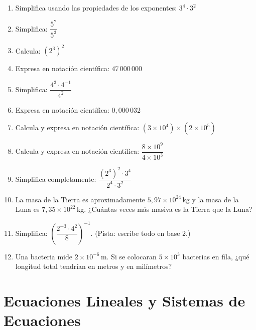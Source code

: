 \documentclass[12pt, a4paper]{article}
\begin{document}
\begin{enumerate}[leftmargin=*, resume]
  \item \facil{} Simplifica usando las propiedades de los exponentes: $3^4 \cdot 3^2$

  \item \facil{} Simplifica: $\dfrac{5^7}{5^3}$

  \item \facil{} Calcula: $(2^3)^2$

  \item \facil{} Expresa en notación científica: $47\,000\,000$

  \item \medio{} Simplifica: $\dfrac{4^3 \cdot 4^{-1}}{4^2}$

  \item \medio{} Expresa en notación científica: $0{,}000\,032$

  \item \medio{} Calcula y expresa en notación científica: $(3 \times 10^4) \times (2 \times 10^5)$

  \item \medio{} Calcula y expresa en notación científica: $\dfrac{8 \times 10^9}{4 \times 10^3}$

  \item \medio{} Simplifica completamente: $\dfrac{(2^3)^2 \cdot 3^4}{2^4 \cdot 3^2}$

  \item \dificil{} La masa de la Tierra es aproximadamente $5{,}97 \times 10^{24}$\,kg y la masa de la Luna es $7{,}35 \times 10^{22}$\,kg. ¿Cuántas veces más masiva es la Tierra que la Luna?

  \item \dificil{} Simplifica: $\left(\dfrac{2^{-3} \cdot 4^2}{8}\right)^{-1}$. (Pista: escribe todo en base 2.)

  \item \dificil{} Una bacteria mide $2 \times 10^{-6}$\,m. Si se colocaran $5 \times 10^3$ bacterias en fila, ¿qué longitud total tendrían en metros y en milímetros?
\end{enumerate}

\newpage

\section{Ecuaciones Lineales y Sistemas de Ecuaciones}
\end{document}
